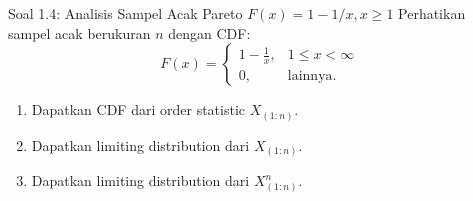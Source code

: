\documentclass[10pt,twoside]{article}
\begin{document}
\begin{soalbox}{Soal 1.4: Analisis Sampel Acak Pareto $F(x) = 1 - 1/x, x \ge 1$}
Perhatikan sampel acak berukuran $n$ dengan CDF:
\[
F(x) = \begin{cases} 1 - \frac{1}{x}, & 1 \le x < \infty \\ 0, & \text{lainnya.} \end{cases}
\]
\begin{enumerate}[label=(\alph*)]
  \item Dapatkan CDF dari order statistic $X_{(1:n)}$.
  \item Dapatkan limiting distribution dari $X_{(1:n)}$.
  \item Dapatkan limiting distribution dari $X_{(1:n)}^n$.
\end{enumerate}
\end{soalbox}
\end{document}
